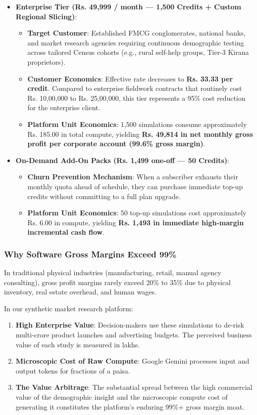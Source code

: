 \documentclass[11pt,a4paper]{article}
\begin{document}
\begin{itemize}
  \item \textbf{Enterprise Tier (Rs. 49,999 / month --- 1,500 Credits + Custom Regional Slicing)}:
  \begin{itemize}[noitemsep]
    \item \textbf{Target Customer}: Established FMCG conglomerates, national banks, and market research agencies requiring continuous demographic testing across tailored Census cohorts (e.g., rural self-help groups, Tier-3 Kirana proprietors).
    \item \textbf{Customer Economics}: Effective rate decreases to \textbf{Rs. 33.33 per credit}. Compared to enterprise fieldwork contracts that routinely cost Rs. 10,00,000 to Rs. 25,00,000, this tier represents a 95\% cost reduction for the enterprise client.
    \item \textbf{Platform Unit Economics}: 1,500 simulations consume approximately Rs. 185.00 in total compute, yielding \textbf{Rs. 49,814 in net monthly gross profit per corporate account (99.6\% gross margin)}.
  \end{itemize}

  \item \textbf{On-Demand Add-On Packs (Rs. 1,499 one-off --- 50 Credits)}:
  \begin{itemize}[noitemsep]
    \item \textbf{Churn Prevention Mechanism}: When a subscriber exhausts their monthly quota ahead of schedule, they can purchase immediate top-up credits without committing to a full plan upgrade.
    \item \textbf{Platform Unit Economics}: 50 top-up simulations cost approximately Rs. 6.00 in compute, yielding \textbf{Rs. 1,493 in immediate high-margin incremental cash flow}.
  \end{itemize}
\end{itemize}

\subsubsection{Why Software Gross Margins Exceed 99\%}
In traditional physical industries (manufacturing, retail, manual agency consulting), gross profit margins rarely exceed 20\% to 35\% due to physical inventory, real estate overhead, and human wages. 

In our synthetic market research platform:
\begin{enumerate}[noitemsep]
  \item \textbf{High Enterprise Value}: Decision-makers use these simulations to de-risk multi-crore product launches and advertising budgets. The perceived business value of each study is measured in lakhs.
  \item \textbf{Microscopic Cost of Raw Compute}: Google Gemini processes input and output tokens for fractions of a paisa.
  \item \textbf{The Value Arbitrage}: The substantial spread between the high commercial value of the demographic insight and the microscopic compute cost of generating it constitutes the platform's enduring 99\%+ gross margin moat.
\end{enumerate}
\end{document}

